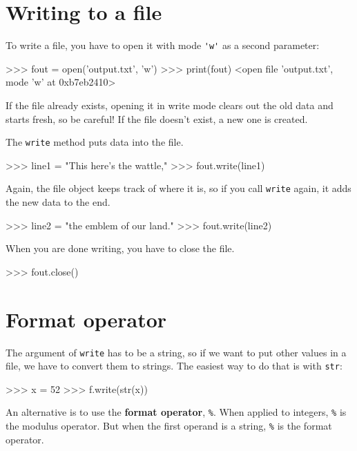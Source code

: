 \section{Writing to a file}



To write a file, you have to open it with mode
\verb"'w'" as a second parameter:

\beforeverb
\begin{pyinterpreter}
>>> fout = open('output.txt', 'w')
>>> print(fout)
<open file 'output.txt', mode 'w' at 0xb7eb2410>
\end{pyinterpreter}
\afterverb
%
If the file already exists, opening it in write mode clears out
the old data and starts fresh, so be careful!
If the file doesn't exist, a new one is created.

The {\tt write} method puts data into the file.

\beforeverb
\begin{pyinterpreter}
>>> line1 = "This here's the wattle,\n"
>>> fout.write(line1)
\end{pyinterpreter}
\afterverb
%
Again, the file object keeps track of where it is, so if
you call {\tt write} again, it adds the new data to the end.

\beforeverb
\begin{pyinterpreter}
>>> line2 = "the emblem of our land.\n"
>>> fout.write(line2)
\end{pyinterpreter}
\afterverb
%
When you are done writing, you have to close the file.

\beforeverb
\begin{pyinterpreter}
>>> fout.close()
\end{pyinterpreter}
\afterverb
%



\section{Format operator}


The argument of {\tt write} has to be a string, so if we want
to put other values in a file, we have to convert them to
strings.  The easiest way to do that is with {\tt str}:

\beforeverb
\begin{pyinterpreter}
>>> x = 52
>>> f.write(str(x))
\end{pyinterpreter}
\afterverb
%
An alternative is to use the {\bf format operator}, {\tt \%}.  When
applied to integers, {\tt \%} is the modulus operator.  But
when the first operand is a string, {\tt \%} is the format operator.

